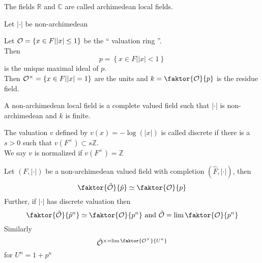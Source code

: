 \documentclass[../main.tex]{subfiles}
\begin{document}
\begin{defn}
	The fields $ \mathbb{R}$ and $\mathbb{C}$ are called archimedean local fields.
\end{defn}
Let $|\cdot|$ be non-archimedean
\begin{defn}
	Let $\mathcal{O} = \left\{ x \in F | |x| \leq 1 \right\} $ be the `` valuation ring ''.\\
	Then 
	\[ 
	p = \left\{ x\in F | |x| < 1 \right\} 
	\]
	is the unique maximal ideal of $p$.\\
	Then $\mathcal{O}^{\times} = \left\{ x \in F | |x| = 1 \right\} $ are the units and $k = \faktor{\O}{p}$ is the residue field. 
\end{defn}
\begin{defn}
	A non-archimedean local field is a complete valued field such that $|\cdot|$ is non-archimedean and $k$ is finite.
\end{defn}
\begin{defn}
	The valuation $v$ defined by $v( x) = - \log( |x|) $ is called discrete if there is a $s>0$ such that $v( F^{\times}) \subset s \mathbb{Z}$.\\
	We say $v$ is normalized if $v( F^{\times}) = \mathbb{Z}$ 
\end{defn}
\begin{propo}
Let $( F,|\cdot|) $ be a non-archimedean  valued field with completion $( \hat{F}, |\cdot|) $, then 
\[ 
\faktor{ \hat{\O}}{\hat{p}} \simeq \faktor{\O}{p}
\]
Further, if $|\cdot|$ has discrete valuation then
\[ 
\faktor{ \hat{\O}}{ \hat{p}^{n}}\simeq \faktor{\O}{p^{n}} \text{ and }  \hat{\O} = \lim \faktor{\O}{p^{n}}
\]
Similarly
\[ 
\hat{\O}^{\times = \lim \faktor{\O^{\times}}{U^{n}}}
\]
for $U^{n}= 1 + p^{n}$ 

\end{propo}







	
\end{document}
